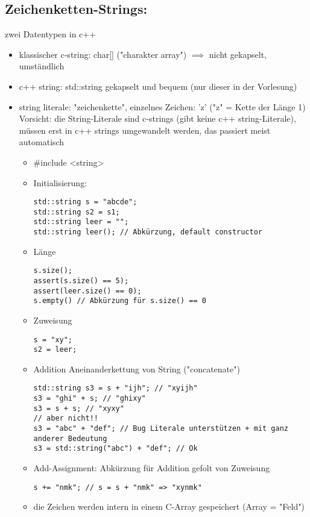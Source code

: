 \documentclass[a4paper]{scrartcl}
\begin{document}
\subsection{Zeichenketten-Strings:}
\label{sec-8-3}
zwei Datentypen in c++
\begin{itemize}
\item klassischer c-string: char[] ("charakter array") $\implies$ nicht gekapselt, umständlich
\item c++ string: std::string gekapselt und bequem (nur dieser in der Vorlesung)
\item string literale: "zeichenkette", einzelnes Zeichen: 'z' ("z" = Kette der Länge 1) \\
     Vorsicht: die String-Literale sind c-strings (gibt keine c++ string-Literale),
müssen erst in c++ strings umgewandelt werden, das passiert meist automatisch
\begin{itemize}
\item \#include <string>
\item Initialisierung:
\begin{verbatim}
std::string s = "abcde";
std::string s2 = s1;
std::string leer = "";
std::string leer(); // Abkürzung, default constructor
\end{verbatim}
\item Länge
\begin{verbatim}
s.size();
assert(s.size() == 5);
assert(leer.size() == 0);
s.empty() // Abkürzung für s.size() == 0
\end{verbatim}
\item Zuweisung
\begin{verbatim}
s = "xy";
s2 = leer;
\end{verbatim}
\item Addition
Aneinanderkettung von String ("concatenate")
\begin{verbatim}
std::string s3 = s + "ijh"; // "xyijh"
s3 = "ghi" + s; // "ghixy"
s3 = s + s; // "xyxy"
// aber nicht!!
s3 = "abc" + "def"; // Bug Literale unterstützen + mit ganz anderer Bedeutung
s3 = std::string("abc") + "def"; // Ok
\end{verbatim}
\item Add-Assignment: Abkürzung für Addition gefolt von Zuweisung
\begin{verbatim}
s += "nmk"; // s = s + "nmk" => "xynmk"
\end{verbatim}
\item die Zeichen werden intern in einem C-Array gespeichert (Array = "Feld") \\

\end{itemize}
\end{itemize}
\end{document}

